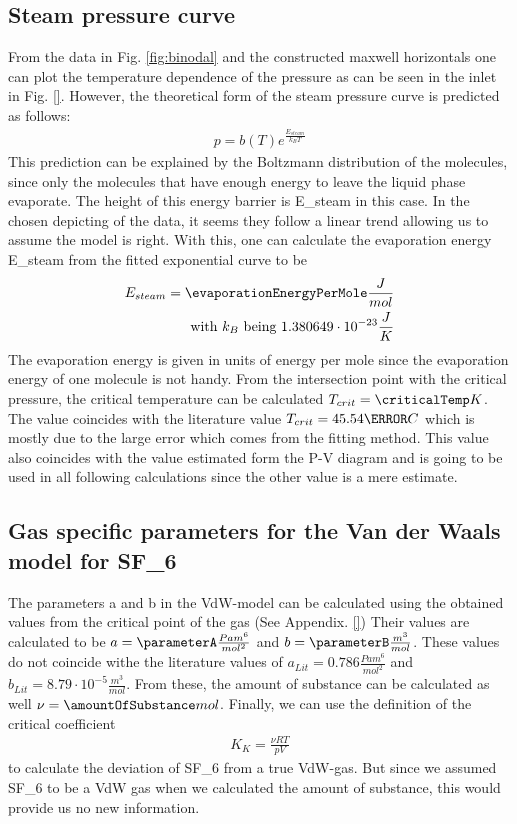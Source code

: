 \documentclass[a4paper,10pt,twocolumn]{article}
\begin{document}
    \subsection{Steam pressure curve}\label{subsec:steamPressureCurve}
    From the data in Fig. \ref{fig:binodal} and the constructed maxwell horizontals one can plot the temperature dependence of the pressure as can be seen in the inlet in Fig. \ref{}.
    However, the theoretical form of the steam pressure curve is predicted as follows:
    \begin{align}
        p=b(T)e^\frac{E_{steam}}{k_B T}
    \end{align}
    This prediction can be explained by the Boltzmann distribution of the molecules, since only the molecules that have enough energy to leave the liquid phase evaporate.
    The height of this energy barrier is E_{steam}\) in this case.
    In the chosen depicting of the data, it seems they follow a linear trend allowing us to assume the model is right.
    With this, one can calculate the evaporation energy E_{steam}\) from the fitted exponential curve to be
    \begin{align}
        E_{steam} = \evaporationEnergyPerMole \frac{J}{mol}
        \endline \text{with } k_B \text{ being } 1.380649\cdot 10^{-23}\frac{J}{K}
    \end{align}
    The evaporation energy is given in units of energy per mole since the evaporation energy of one molecule is not handy. 
    From the intersection point with the critical pressure, the critical temperature can be calculated $T_{crit}=\criticalTemp K$.
    The value coincides with the literature value $T_{crit} = 45.54\degree C$ which is mostly due to the large error which comes from the fitting method.
    This value also coincides with the value estimated form the P-V diagram and is going to be used in all following calculations since the other value is a mere estimate.
    
    \subsection{Gas specific parameters for the Van der Waals model for SF_6\)}\label{subsec:gasSpecParams}
    The parameters a and b in the VdW-model can be calculated using the obtained values from the critical point of the gas (See Appendix. \ref{})
    Their values are calculated to be $a = \parameterA \frac{Pa m^6}{mol^2}$ and $b =\parameterB \frac{m^3}{mol}$.
    These values do not coincide withe the literature values of $a_{Lit} = 0.786 \frac{Pa m^6}{mol^2}$ and $b_{Lit} = 8.79\cdot 10^{-5} \frac{m^3}{mol}$.
    From these, the amount of substance can be calculated as well $\nu = \amountOfSubstance mol$.
    Finally, we can use the definition of the critical coefficient
    \begin{align}\label{eq:critcalCoeff}
        K_K = \frac{\nu RT}{pV}
    \end{align}
    to calculate the deviation of SF_6\) from a true VdW-gas.
    But since we assumed SF_6\) to be a VdW gas when we calculated the amount of substance, this would provide us no new information.
    
\end{document}
